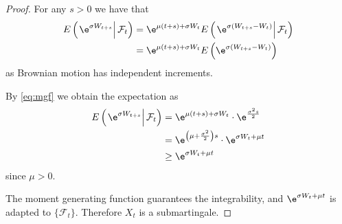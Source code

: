     \begin{proof}
        For any $s>0$ we have that
        \newcommand{\conde}[1]{E\left(\left. #1 \right|\mathcal F_t\right)}
        \[\begin{aligned}
            \conde{\e^{\sigma W_{t+s}}}
            &=\e^{\mu(t+s)+\sigma W_t}\conde{\e^{\sigma(W_{t+s}-W_t)}}\\
            &=\e^{\mu(t+s)+\sigma W_t}E\left(\e^{\sigma(W_{t+s}-W_t)}\right)
        \end{aligned}\]
        as Brownian motion has independent increments.

        By \cref{eq:mgf} we obtain the expectation as
        \[\begin{aligned}
            \conde{\e^{\sigma W_{t+s}}}
            &=\e^{\mu(t+s)+\sigma W_t}\cdot\e^{\frac{\sigma^2s}{2}}\\
            &=\e^{\left(\mu+\frac{\sigma^2}{2}\right)s}\cdot\e^{\sigma W_t+\mu t}\\
            &\geq\e^{\sigma W_t+\mu t}
        \end{aligned}\]
        since $\mu>0$.

        The moment generating function guarantees the integrability,
        and $\e^{\sigma W_t+\mu t}$ is adapted to $\{\mathcal F_t\}$.
        Therefore $X_t$ is a submartingale.
    \end{proof}

